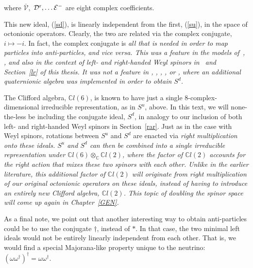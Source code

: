 \documentclass[letterpaper,12pt,titlepage,oneside,final]{book}
\newcommand{\C}{\mathbb{C}}
\newcommand{\CLsix}{\mathbb{C}l(6)}
\newcommand{\CLtwo}{\mathbb{C}l(2)}
\newcommand{\oot}{\omega \omega^{\dagger}}
\begin{document}
\noindent where $\bar{\mathcal{V}},$  $\mathcal{D}^{\textup{r}}, \dots \mathcal{E}^{-} $ are eight complex coefficients.   

This new ideal, (\ref{sd}), is linearly independent from the first, (\ref{su}), in the space of octonionic operators.   Clearly, the two are related via the complex conjugate, $i \mapsto -i$.  In fact, the complex conjugate is \it all \rm that is needed in order to map particles into anti-particles, and vice versa.  This was a feature in the models of~\cite{GGstats}, \cite{Gen}, and also in the context of left- and right-handed Weyl spinors in~\cite{UTI} and Section~\ref{lr} of this thesis.  It was not a feature in \cite{Grass}, \cite{wow}, \cite{wowagain}, \cite{dixon}, or \cite{matter},  where an additional quaternionic algebra was implemented in order to obtain $S^d$.







The Clifford algebra, $\CLsix$, is known to have just a single 8-complex-dimensional irreducible representation, as in $S^u$, above.  In this text, we will none-the-less be including the conjugate ideal, $S^d$, in analogy to our inclusion of both left- and right-handed Weyl spinors in Section~\ref{rar}.  Just as in the case with Weyl spinors, rotations between $S^u$ and $S^d$ are enacted via \it right \rm multiplication onto these ideals.  $S^u$ and $S^d$ can then be combined into a single irreducible representation under $\CLsix \otimes_{\C} \CLtwo$, where the factor of $\CLtwo$ accounts for the right action that mixes these two spinors with each other. Unlike in the earlier literature, this additional factor of $\CLtwo$ will originate from right multiplication of our original octonionic operators on these ideals, instead of having to introduce an entirely new Clifford algebra, $\CLtwo$.  This topic of doubling the spinor space will come up again in Chapter~\ref{GEN}.

As a final note, we point out that another interesting way to obtain anti-particles could be to use the conjugate $\dagger$, instead of $*$.  In that case, the two minimal left ideals would not be entirely linearly independent from each other.  That is, we would find a special Majorana-like property unique to the neutrino:  $\left(\oot\right)^{\dagger} = \oot$.






\end{document}
